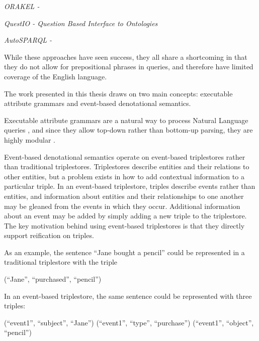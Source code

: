 \documentclass[../main.tex]{subfiles}
\begin{document}

{\em ORAKEL \cite{cimiano2007orakel} - }

{\em QuestIO \cite{tablan2008natural} - Question Based Interface to Ontologies}

{\em AutoSPARQL \cite{lehmann2011autosparql} - }


While these approaches have seen success, they all share a shortcoming in that they do not allow for prepositional phrases in queries, and therefore have limited coverage of the English language.


The work presented in this thesis draws on two main concepts: executable attribute grammars\cite{frosthafiz2008} and event-based denotational semantics\cite{frostagbola2014}.

Executable attribute grammars are a natural way to process Natural Language queries \cite{?}, and since they allow top-down rather than bottom-up parsing, they are highly modular \cite{frosthafiz2008}.

Event-based denotational semantics operate on event-based triplestores\cite{frost2014demonstration} rather than traditional triplestores.  Triplestores describe entities and their relations to other entities, but a problem exists in how to add contextual information to a particular triple.  In an event-based triplestore, triples describe events rather than entities, and information about entities and their relationships to one another may be gleaned from the events in which they occur.  Additional information about an event may be added by simply adding a new triple to the triplestore.  The key motivation behind using event-based triplestores is that they directly support reification on triples\cite{?}.

As an example, the sentence ``Jane bought a pencil'' could be represented in a traditional triplestore with the triple


\begin{code}
	(``Jane'', ``purchased'', ``pencil'')
\end{code}

In an event-based triplestore, the same sentence could be represented with three triples:

\begin{code}
	(``event1'', ``subject'', ``Jane'')
	(``event1'', ``type'', ``purchase'')
	(``event1'', ``object'', ``pencil'')
\end{code}
	
\end{document}
